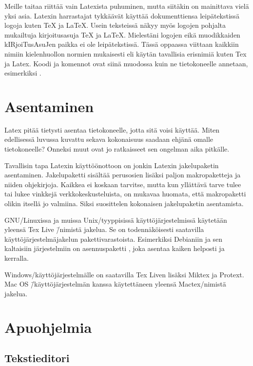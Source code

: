 Meille taitaa riittää vain Latexista puhuminen, mutta siitäkin on
mainittava vielä yksi asia. Latexin harrastajat tykkäävät käyttää
dokumenttiensa leipätekstissä logoja kuten \TeX{} ja \LaTeX{}. Usein
teksteissä näkyy myös logojen pohjalta mukailtuja kir\-joi\-tus\-asu\-ja
TeX ja LaTeX. Mielestäni logojen eikä muodikkaiden
kIR\-joi\-Tus\-Asu\-Jen paikka ei ole leipätekstissä. Tässä oppaassa
viittaan kaikkiin nimiin kielenhuollon normien mukaisesti eli käytän
tavallisia erisnimiä kuten Tex ja Latex. Koodi ja komennot ovat siinä
muodossa kuin ne tietokoneelle annetaan, esimerkiksi .

\section{Asentaminen}
\label{luku:asentaminen}

Latex pitää tietysti asentaa tietokoneelle, jotta sitä voisi käyttää.
Miten edellisessä luvussa kuvattu sekava kokonaisuus saadaan ehjänä
omalle tietokoneelle? Onneksi muut ovat jo ratkaisseet sen ongelman aika
pitkälle.

Tavallisin tapa Latexin käyttöön\-ottoon on jonkin Latexin jakelupaketin
asentaminen. Jakelupaketti sisältää perus\-osien lisäksi paljon
makropaketteja ja niiden ohjekirjoja. Kaikkea ei koskaan tarvitse, mutta
kun yllättävä tarve tulee tai lukee vinkkejä verkkokeskusteluista, on
mukavaa huomata, että makropaketti olikin itsellä jo valmiina. Siksi
suosittelen kokonaisen jakelupaketin asentamista.

GNU/Linuxissa ja muissa Unix\-/tyyppisissä käyttöjärjestelmissä
käytetään yleensä Tex Live \=/nimistä jakelua. Se on todennäköisesti
saatavilla käyttöjärjestelmäjakelun pakettivarastoista. Esimerkiksi
Debianiin ja sen kaltaisiin järjestelmiin on asennuspaketti
, joka asentaa kaiken helposti ja kerralla.

Windows\-/käyttöjärjestelmälle on saatavilla Tex Liven lisäksi Miktex ja
Protext. Mac OS \=/käyttöjärjestelmän kanssa käytettäneen yleensä
Mactex\-/nimistä jakelua.

\section{Apuohjelmia}

\subsection{Tekstieditori}

